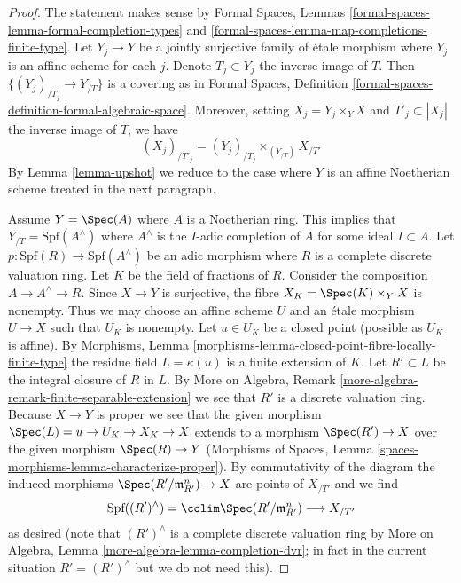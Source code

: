 \begin{proof}
The statement makes sense by
Formal Spaces, Lemmas \ref{formal-spaces-lemma-formal-completion-types} and
\ref{formal-spaces-lemma-map-completions-finite-type}.
Let $Y_j \to Y$ be a jointly surjective family of \'etale morphism
where $Y_j$ is an affine scheme for each $j$.
Denote $T_j \subset Y_j$ the inverse image of $T$.
Then $\{(Y_j)_{/T_j} \to Y_{/T}\}$ is a covering as in
Formal Spaces, Definition \ref{formal-spaces-definition-formal-algebraic-space}.
Moreover, setting $X_j = Y_j \times_Y X$ and $T'_j \subset |X_j|$
the inverse image of $T$, we have
$$
(X_j)_{/T'_j} = (Y_j)_{/T_j} \times_{(Y_{/T})} X_{/T'}
$$
By Lemma \ref{lemma-upshot} we reduce to the case where
$Y$ is an affine Noetherian scheme treated in the next paragraph.

\medskip\noindent
Assume $Y = \Spec(A)$ where $A$ is a Noetherian ring. This implies that
$Y_{/T} = \text{Spf}(A^\wedge)$ where $A^\wedge$ is the $I$-adic completion
of $A$ for some ideal $I \subset A$. Let
$p : \text{Spf}(R) \to \text{Spf}(A^\wedge)$
be an adic morphism where $R$ is a complete discrete valuation ring.
Let $K$ be the field of fractions of $R$.
Consider the composition $A \to A^\wedge \to R$.
Since $X \to Y$ is surjective, the fibre $X_K = \Spec(K) \times_Y X$
is nonempty. Thus we may choose an affine scheme $U$ and an \'etale
morphism $U \to X$ such that $U_K$ is nonempty.
Let $u \in U_K$ be a closed point (possible as $U_K$ is affine). By
Morphisms, Lemma \ref{morphisms-lemma-closed-point-fibre-locally-finite-type}
the residue field $L = \kappa(u)$ is a finite extension of $K$. Let
$R' \subset L$ be the integral closure of $R$ in $L$. By
More on Algebra, Remark \ref{more-algebra-remark-finite-separable-extension}
we see that $R'$ is a discrete valuation ring.
Because $X \to Y$ is proper we see that the given morphism
$\Spec(L) = u \to U_K \to X_K \to X$ extends to a morphism
$\Spec(R') \to X$ over the given morphism $\Spec(R) \to Y$
(Morphisms of Spaces,
Lemma \ref{spaces-morphisms-lemma-characterize-proper}).
By commutativity of the diagram the induced morphisms
$\Spec(R'/\mathfrak m_{R'}^n) \to X$ are points of $X_{/T'}$
and we find
$$
\text{Spf}((R')^\wedge) = \colim \Spec(R'/\mathfrak m_{R'}^n)
\longrightarrow X_{/T'}
$$
as desired (note that $(R')^\wedge$ is a complete discrete valuation ring
by More on Algebra, Lemma \ref{more-algebra-lemma-completion-dvr};
in fact in the current situation $R' = (R')^\wedge$ but we do not
need this).
\end{proof}

